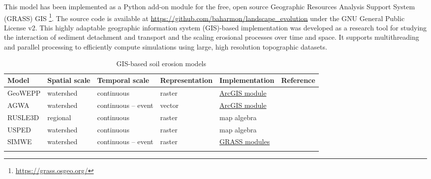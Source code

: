 \documentclass[esurf, manuscript]{copernicus}
\begin{document}
This model has been implemented 
as a Python add-on module 
for the free, open source
Geographic Resources Analysis Support System (GRASS) GIS
\footnote{\url{https://grass.osgeo.org/}}. 
The source code is available at 
\url{https://github.com/baharmon/landscape\_evolution} 
under the GNU General Public License v2. %
%
This highly adaptable
geographic information system (GIS)-based implementation
was developed as a research tool for studying 
the interaction of sediment detachment and transport
and the scaling erosional processes over time and space. %
It supports multithreading and parallel processing
to efficiently compute simulations 
using large, high resolution topographic datasets.





\begin{table}
\small
\caption{GIS-based soil erosion models}
\begin{tabu} to \textwidth {XXXXXl}
\toprule
Model & Spatial scale &  Temporal scale & Representation & Implementation & Reference\\
\midrule
GeoWEPP & watershed & continuous & raster & \href{http://geowepp.geog.buffalo.edu/}{ArcGIS module} & \cite{Flanagan2013}\\
AGWA  & watershed & continuous -- event & vector & \href{https://www.tucson.ars.ag.gov/agwa/}{ArcGIS module} & \cite{Guertin2015}\\
RUSLE3D & regional & continuous & raster & map algebra & \cite{Mitasova1996}\\
USPED & watershed & continuous & raster & map algebra & \cite{Mitasova1996}\\
SIMWE & watershed & continuous -- event & raster & \href{https://grass.osgeo.org/grass74/manuals/r.sim.sediment.html}{GRASS modules} & \cite{Mitas1998}\\
\bottomrule
\\
\end{tabu}
\label{table:erosion_models} 
\end{table}
\end{document}
